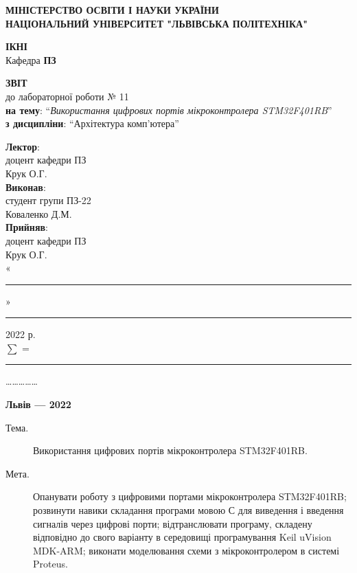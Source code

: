 \documentclass{article}
\newcommand\subject{Архітектура комп'ютера}
\newcommand\lecturer{доцент кафедри ПЗ\\Крук О.Г.}
\newcommand\teacher{доцент кафедри ПЗ\\Крук О.Г.}
\newcommand\mygroup{ПЗ-22}
\newcommand\lab{11}
\newcommand\theme{Використання цифрових портів мікроконтролера STM32F401RB}
\newcommand\purpose{Опанувати роботу з цифровими портами мікроконтролера STM32F401RB; розвинути навики складання програми мовою С для виведення і введення сигналів через цифрові порти; відтранслювати програму, складену відповідно до свого варіанту в середовищі програмування Keil uVision MDK-ARM; виконати моделювання схеми з мікроконтролером в системі Proteus}
\begin{document}
	\begin{normalsize}
		\begin{titlepage}
			\thispagestyle{empty}
			\begin{center}
				\textbf{МІНІСТЕРСТВО ОСВІТИ І НАУКИ УКРАЇНИ\\
					НАЦІОНАЛЬНИЙ УНІВЕРСИТЕТ "ЛЬВІВСЬКА ПОЛІТЕХНІКА"}
			\end{center}
			\begin{flushright}
				\textbf{ІКНІ}\\
				Кафедра \textbf{ПЗ}
			\end{flushright}
			\vspace{200pt}
			\begin{center}
				\textbf{ЗВІТ}\\
				\vspace{10pt}
				до лабораторної роботи № \lab\\
				\textbf{на тему}: “\textit{\theme}”\\
				\textbf{з дисципліни}: “\subject”
			\end{center}
			\vspace{112pt}
			\begin{flushright}
				
				\textbf{Лектор}:\\
				\lecturer\\
				\vspace{28pt}
				\textbf{Виконав}:\\
				
				студент групи \mygroup\\
				Коваленко Д.М.\\
				\vspace{28pt}
				\textbf{Прийняв}:\\
				
				\teacher\\
				
				\vspace{28pt}
				«\rule{1cm}{0.15mm}» \rule{1.5cm}{0.15mm} 2022 р.\\
				$\sum$ = \rule{1cm}{0.15mm}……………\\
				
			\end{flushright}
			\vspace{\fill}
			\begin{center}
				\textbf{Львів — 2022}
			\end{center}
		\end{titlepage}
		
		\begin{description}
			\item[Тема.] \theme.
			\item[Мета.] \purpose.
		\end{description}
		

\end{normalsize}
\end{document}
